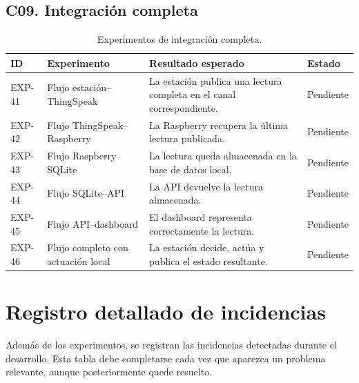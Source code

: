 \subsection{C09. Integración completa}

\begin{table}[H]
\centering
\renewcommand{\arraystretch}{1.2}
\scriptsize
\begin{tabular}{|p{}|p{}|p{}|p{}|}
\hline
\rowcolor{gray!20}
\textbf{ID} & \textbf{Experimento} & \textbf{Resultado esperado} & \textbf{Estado} \\
\hline
EXP-41 & Flujo estación--ThingSpeak & La estación publica una lectura completa en el canal correspondiente. & Pendiente \\
\hline
EXP-42 & Flujo ThingSpeak--Raspberry & La Raspberry recupera la última lectura publicada. & Pendiente \\
\hline
EXP-43 & Flujo Raspberry--SQLite & La lectura queda almacenada en la base de datos local. & Pendiente \\
\hline
EXP-44 & Flujo SQLite--API & La API devuelve la lectura almacenada. & Pendiente \\
\hline
EXP-45 & Flujo API--dashboard & El dashboard representa correctamente la lectura. & Pendiente \\
\hline
EXP-46 & Flujo completo con actuación local & La estación decide, actúa y publica el estado resultante. & Pendiente \\
\hline
\end{tabular}
\caption{Experimentos de integración completa.}
\label{tab:exp_integracion_completa}
\end{table}

\section{Registro detallado de incidencias}

Además de los experimentos, se registran las incidencias detectadas durante el desarrollo. Esta tabla debe completarse cada vez que aparezca un problema relevante, aunque posteriormente quede resuelto.

